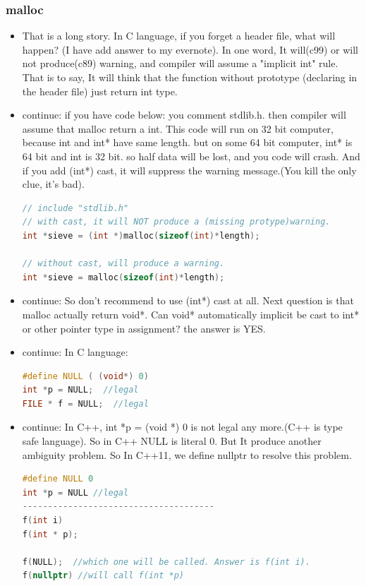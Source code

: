 \documentclass[a4paper,12pt,twoside]{book}
\begin{document}
\subsubsection{malloc}
\begin{itemize}
\item That is a long story. In C language, if you forget a header file, what will happen? (I have add answer to my evernote). In one word, It will(c99) or will not produce(c89) warning, and compiler will assume a "implicit int" rule. That is to say, It will think that the function without prototype (declaring in the header file) just return int type.

\item continue: if you have code below: you comment stdlib.h. then compiler will assume that malloc return a int.  This code will run on 32 bit computer, because int and int* have same length. but on some 64 bit computer, int* is 64 bit and int is 32 bit.  so half data will be lost, and you code will crash.
And if you add (int*) cast, it will suppress the warning message.(You kill the only clue, it's bad).
 \begin{lstlisting}[frame=single, language=c++]
 // include "stdlib.h"
// with cast, it will NOT produce a (missing protype)warning.
int *sieve = (int *)malloc(sizeof(int)*length);

// without cast, will produce a warning.
int *sieve = malloc(sizeof(int)*length);
\end{lstlisting}

\item continue: So don't recommend to use (int*) cast at all. Next question is that malloc actually return void*. Can void* automatically implicit be cast to int* or other pointer type in assignment? the answer is YES.

\item  continue: In C language:
 \begin{lstlisting}[frame=single, language=c++]
#define NULL ( (void*) 0)
int *p = NULL;  //legal
FILE * f = NULL;  //legal
\end{lstlisting}

\item continue: In C++, int *p = (void *) 0 is not legal any more.(C++ is type safe language).  So in C++ NULL is literal 0. But It produce another ambiguity problem.  So In C++11, we define nullptr to resolve this problem.
 \begin{lstlisting}[frame=single, language=c++]
#define NULL 0
int *p = NULL //legal
--------------------------------------
f(int i)
f(int * p);

f(NULL);  //which one will be called. Answer is f(int i).
f(nullptr) //will call f(int *p)
\end{lstlisting}
\end{itemize}
\end{document}
